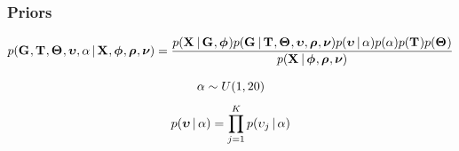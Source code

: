 \begin{frame}[t]
    \frametitle{Priors}
    \begin{displaybox}
        \footnotesize
        \[
            p(\geneTreeVector, \divTimeMapVector, \demographicParamVector, 
            \locusMutationRateScalarVector, \locusRateHetShapeParameter \given
            \alignmentVector, \hkyModelVector, \ploidyScalarVector,
            \mutationRateScalarConstantVector) =
            \frac{p(\alignmentVector \given \geneTreeVector, \hkyModelVector)
                p(\geneTreeVector \given \divTimeMapVector, \demographicParamVector,
                \locusMutationRateScalarVector, \ploidyScalarVector,
                \mutationRateScalarConstantVector)
                p(\locusMutationRateScalarVector \given \locusRateHetShapeParameter)
                p(\locusRateHetShapeParameter)
                p(\divTimeMapVector)
                p(\demographicParamVector)}{
                p(\alignmentVector \given \hkyModelVector, \ploidyScalarVector,
                \mutationRateScalarConstantVector)}
        \]\vspace{0mm}
    \end{displaybox}
    \[
        \alpha \sim U(1, 20)
    \]
    \[
        p(\boldsymbol{\upsilon} \,|\, \alpha) =
        \prod_{j=1}^{K} p(\upsilon_{j} \,|\,
        \alpha)
    \]
\end{frame}

